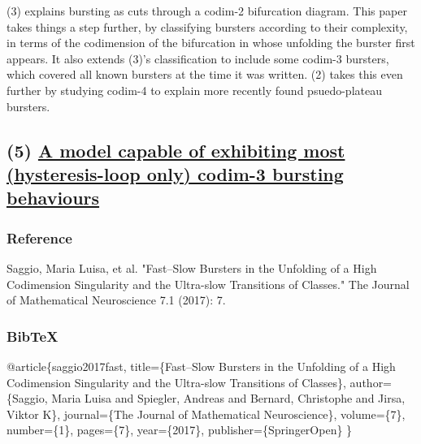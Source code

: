 \documentclass[11pt]{article}
\begin{document}
(3) explains bursting as cuts through a codim-2 bifurcation diagram. 
This paper takes things a step further, by classifying bursters according to their complexity, in terms of the codimension of the bifurcation in whose unfolding the burster first appears.
It also extends (3)'s classification to include some codim-3 bursters, which covered all known bursters at the time it was written.
(2) takes this even further by studying codim-4 to explain more recently found psuedo-plateau bursters.

\subsection{(5) \href{https://mathematical-neuroscience.springeropen.com/articles/10.1186/s13408-017-0050-8}{A model capable of exhibiting most (hysteresis-loop only) codim-3 bursting behaviours}}
\label{sec:org8927162}
\subsubsection{Reference}
\label{sec:org432943c}
Saggio, Maria Luisa, et al. "Fast–Slow Bursters in the Unfolding of a High Codimension Singularity and the Ultra-slow Transitions of Classes." The Journal of Mathematical Neuroscience 7.1 (2017): 7.

\subsubsection{BibTeX}
\label{sec:org5665555}
@article\{saggio2017fast,
  title=\{Fast--Slow Bursters in the Unfolding of a High Codimension Singularity and the Ultra-slow Transitions of Classes\},
  author=\{Saggio, Maria Luisa and Spiegler, Andreas and Bernard, Christophe and Jirsa, Viktor K\},
  journal=\{The Journal of Mathematical Neuroscience\},
  volume=\{7\},
  number=\{1\},
  pages=\{7\},
  year=\{2017\},
  publisher=\{SpringerOpen\}
\}
\end{document}
